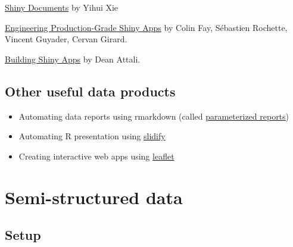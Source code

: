 \documentclass[
]{book}
\providecommand{\tightlist}{%
  \setlength{\itemsep}{0pt}\setlength{\parskip}{0pt}}
\begin{document}
\href{https://bookdown.org/yihui/rmarkdown/shiny-documents.html}{Shiny Documents} by Yihui Xie

\href{https://engineering-shiny.org/}{Engineering Production-Grade Shiny Apps} by Colin Fay, Sébastien Rochette, Vincent Guyader, Cervan Girard.

\href{https://stat545.com/shiny-tutorial.html}{Building Shiny Apps} by Dean Attali.

\hypertarget{other-useful-data-products}{%
\section{Other useful data products}\label{other-useful-data-products}}

\begin{itemize}
\tightlist
\item
  Automating data reports using rmarkdown (called \href{https://rmarkdown.rstudio.com/developer_parameterized_reports.html\%23parameter_types\%2F}{parameterized reports})
\item
  Automating R presentation using \href{http://slidify.org/index.html}{slidify}
\item
  Creating interactive web apps using \href{https://rstudio.github.io/leaflet/}{leaflet}
\end{itemize}

\hypertarget{semi_structured_data}{%
\chapter{Semi-structured data}\label{semi_structured_data}}

\hypertarget{setup-4}{%
\section{Setup}\label{setup-4}}
\end{document}
